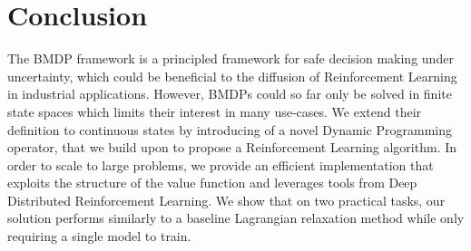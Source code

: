 \documentclass{article}
\begin{document}
\section{Conclusion}
The BMDP framework is a principled framework for safe decision making under uncertainty, which could be beneficial to the diffusion of Reinforcement Learning in industrial applications. However, BMDPs could so far only be solved in finite state spaces which limits their interest in many use-cases. We extend their definition to continuous states by introducing of a novel Dynamic Programming operator, that we build upon to propose a Reinforcement Learning algorithm. In order to scale to large problems, we provide an efficient implementation that exploits the structure of the value function and leverages tools from Deep Distributed Reinforcement Learning. We show that on two practical tasks, our solution performs similarly to a baseline Lagrangian relaxation method while only requiring a single model to train.



%




\clearpage

\end{document}
